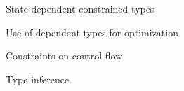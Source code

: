 %
%
%
%

State-dependent constrained types

Use of dependent types for optimization

Constraints on control-flow

Type inference

